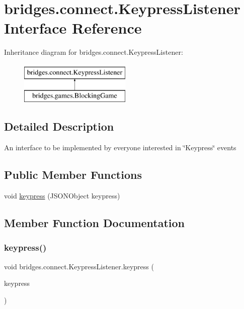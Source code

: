 \hypertarget{interfacebridges_1_1connect_1_1_keypress_listener}{}\section{bridges.\+connect.\+Keypress\+Listener Interface Reference}
\label{interfacebridges_1_1connect_1_1_keypress_listener}
Inheritance diagram for bridges.\+connect.\+Keypress\+Listener\+:\begin{figure}[H]
\begin{center}
\leavevmode
\includegraphics[height=2.000000cm]{interfacebridges_1_1connect_1_1_keypress_listener}
\end{center}
\end{figure}


\subsection{Detailed Description}
An interface to be implemented by everyone interested in \char`\"{}\+Keypress\char`\"{} events \subsection*{Public Member Functions}
\begin{DoxyCompactItemize}
\item 
void \hyperlink{interfacebridges_1_1connect_1_1_keypress_listener_af713d94f36bce842f39ce0aea4db8da6}{keypress} (J\+S\+O\+N\+Object keypress)
\end{DoxyCompactItemize}


\subsection{Member Function Documentation}
\mbox{\label{interfacebridges_1_1connect_1_1_keypress_listener_af713d94f36bce842f39ce0aea4db8da6}} 
\subsubsection{\texorpdfstring{keypress()}{keypress()}}
{\footnotesize\ttfamily void bridges.\+connect.\+Keypress\+Listener.\+keypress (\begin{DoxyParamCaption}\item[{J\+S\+O\+N\+Object}]{keypress }\end{DoxyParamCaption})}



